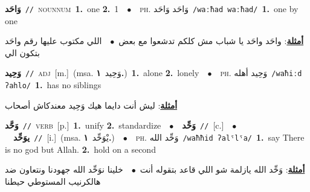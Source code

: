 \documentclass[10pt,a4paper,twoside]{article} %
\begin{document}
\begin{multicols}{2}
{\setlength\topsep{0pt}\textbf{\foreignlanguage{arabic}{وَاحَد}}\ {\color{gray}\texttt{//}\color{black}}\ \textsc{noun\textunderscore num}\ \textbf{1.}~one  \textbf{2.}~1\ \ $\bullet$\ \ \textsc{ph.} \color{gray} \foreignlanguage{arabic}{وَاحَد وَاحَد}\color{black}\ {\color{gray}\texttt{/{\sffamily waːħad waːħad}/}\color{black}}\ \textbf{1.}~one by one\  \begin{flushright}\color{gray}\foreignlanguage{arabic}{\textbf{\underline{\foreignlanguage{arabic}{أمثلة}}}: واحَد واحَد يا شباب مش كلكم تدشعوا مع بعض\ $\bullet$\ \  اللي مكتوب عليها رقم واحَد بتكون الي}\end{flushright}\color{black}} \vspace{2mm}

{\setlength\topsep{0pt}\textbf{\foreignlanguage{arabic}{وَحِيد}}\ {\color{gray}\texttt{//}\color{black}}\ \textsc{adj}\ [m.]\ \color{gray}(msa. \foreignlanguage{arabic}{وَحِيد}~\foreignlanguage{arabic}{\textbf{١.}})\color{black}\ \textbf{1.}~alone  \textbf{2.}~lonely\ \ $\bullet$\ \ \textsc{ph.} \color{gray} \foreignlanguage{arabic}{وَحِيد أهله}\color{black}\ {\color{gray}\texttt{/{\sffamily waħiːd ʔahlo}/}\color{black}}\ \textbf{1.}~has no siblings\  \begin{flushright}\color{gray}\foreignlanguage{arabic}{\textbf{\underline{\foreignlanguage{arabic}{أمثلة}}}: ليش أنت دايما هيك وَحِيد معندكاش أصحاب}\end{flushright}\color{black}} \vspace{2mm}

{\setlength\topsep{0pt}\textbf{\foreignlanguage{arabic}{وَحَّد}}\ {\color{gray}\texttt{//}\color{black}}\ \textsc{verb}\ [p.]\ \textbf{1.}~unify  \textbf{2.}~standardize\ \ $\bullet$\ \ \setlength\topsep{0pt}\textbf{\foreignlanguage{arabic}{وَحِّد}}\ {\color{gray}\texttt{//}\color{black}}\ [c.]\ \ $\bullet$\ \ \setlength\topsep{0pt}\textbf{\foreignlanguage{arabic}{يوَحِّد}}\ {\color{gray}\texttt{//}\color{black}}\ [i.]\ \color{gray}(msa. \foreignlanguage{arabic}{يْوَحِّد}~\foreignlanguage{arabic}{\textbf{١.}})\color{black}\ \ $\bullet$\ \ \textsc{ph.} \color{gray} \foreignlanguage{arabic}{وَحِّد الله}\color{black}\ {\color{gray}\texttt{/{\sffamily waħħid ʔalˤlˤa}/}\color{black}}\ \textbf{1.}~say There is no god but Allah.  \textbf{2.}~hold on a second\  \begin{flushright}\color{gray}\foreignlanguage{arabic}{\textbf{\underline{\foreignlanguage{arabic}{أمثلة}}}: وَحِّد الله يازلمة شو اللي قاعد بتقوله أنت\ $\bullet$\ \  خلينا نوَحِّد الله جهودنا ونتعاون ضد هالكرنيب المستوطي حيطنا}\end{flushright}\color{black}} \vspace{2mm}


\end{multicols}
\end{document}
